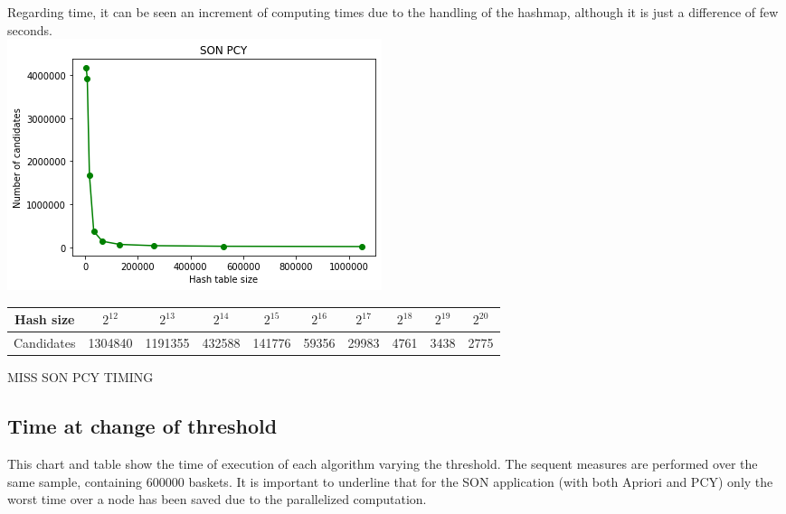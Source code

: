 \documentclass[14pt]{extarticle}
\begin{document}
Regarding time, it can be seen an increment of computing times due to the handling of the hashmap, although it is just a difference of few seconds.\\
\includegraphics[scale=1]{sonpcy_candidates.png}\\
\begin{center}
\hspace*{-1,5cm}
\begin{tabular}{ |c||c|c|c|c|c|c|c|c|c| } 
 \hline
 Hash size & $2^{12}$ & $2^{13}$ & $2^{14}$ & $2^{15}$ & $2^{16}$ & $2^{17}$ & $2^{18}$ & $2^{19}$ & $2^{20}$ \\
 \hline
 Candidates & 1304840 & 1191355 & 432588 & 141776 & 59356 & 29983 &  4761 & 3438 & 2775 \\
 \hline
\end{tabular}
\end{center}
MISS SON PCY TIMING\\
\subsection{Time at change of threshold}
This chart and table show the time of execution of each algorithm varying the threshold. 
The sequent measures are performed over the same sample, containing 600000 baskets.
It is important to underline that for the SON application (with both Apriori and PCY) only the worst time over a node has been saved due to the parallelized computation.\\
\end{document}
